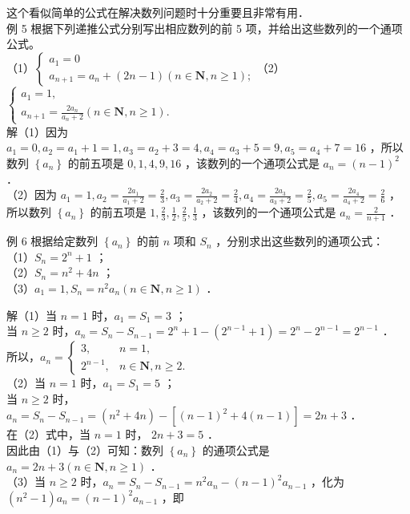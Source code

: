 \documentclass[10pt]{article}
\begin{document}
这个看似简单的公式在解决数列问题时十分重要且非常有用．\\
例 5 根据下列递推公式分别写出相应数列的前 5 项，并给出这些数列的一个通项公式。\\
（1）\(\left\{\begin{array}{l}a_{1}=0 \\ a_{n+1}=a_{n}+(2 n-1)(n \in \mathbf{N}, n \geqslant 1) ;\end{array}\right.\)（2）\(\left\{\begin{array}{l}a_{1}=1, \\ a_{n+1}=\frac{2 a_{n}}{a_{n}+2}(n \in \mathbf{N}, n \geqslant 1) .\end{array}\right.\)\\
解（1）因为 \(a_{1}=0, a_{2}=a_{1}+1=1, a_{3}=a_{2}+3=4, a_{4}=a_{3}+5=9, a_{5}=a_{4}+7=16\) ，所以数列 \(\left\{a_{n}\right\}\) 的前五项是 \(0,1,4,9,16\) ，该数列的一个通项公式是 \(a_{n}=(n-1)^{2}\) ．\\
（2）因为 \(a_{1}=1, a_{2}=\frac{2 a_{1}}{a_{1}+2}=\frac{2}{3}, a_{3}=\frac{2 a_{2}}{a_{2}+2}=\frac{2}{4}, a_{4}=\frac{2 a_{3}}{a_{3}+2}=\frac{2}{5}, a_{5}=\frac{2 a_{4}}{a_{4}+2}=\frac{2}{6}\) ，所以数列 \(\left\{a_{n}\right\}\) 的前五项是 \(1, \frac{2}{3}, \frac{1}{2}, \frac{2}{5}, \frac{1}{3}\) ，该数列的一个通项公式是 \(a_{n}=\frac{2}{n+1}\) ．

例 6 根据给定数列 \(\left\{a_{n}\right\}\) 的前 \(n\) 项和 \(S_{n}\) ，分别求出这些数列的通项公式：\\
（1）\(S_{n}=2^{n}+1\) ；\\
（2）\(S_{n}=n^{2}+4 n\) ；\\
（3）\(a_{1}=1, S_{n}=n^{2} a_{n}(n \in \mathbf{N}, n \geqslant 1)\) ．

解（1）当 \(n=1\) 时，\(a_{1}=S_{1}=3\) ；\\
当 \(n \geqslant 2\) 时，\(a_{n}=S_{n}-S_{n-1}=2^{n}+1-\left(2^{n-1}+1\right)=2^{n}-2^{n-1}=2^{n-1}\) ．\\
所以，\(a_{n}= \begin{cases}3, & n=1, \\ 2^{n-1}, & n \in \mathbf{N}, n \geqslant 2 .\end{cases}\)\\
（2）当 \(n=1\) 时，\(a_{1}=S_{1}=5\) ；\\
当 \(n \geqslant 2\) 时，\(a_{n}=S_{n}-S_{n-1}=\left(n^{2}+4 n\right)-\left[(n-1)^{2}+4(n-1)\right]=2 n+3\) ．\\
在（2）式中，当 \(n=1\) 时， \(2 n+3=5\) ．\\
因此由（1）与（2）可知：数列 \(\left\{a_{n}\right\}\) 的通项公式是 \(a_{n}=2 n+3(n \in \mathbf{N}, n \geqslant 1)\) ．\\
（3）当 \(n \geqslant 2\) 时，\(a_{n}=S_{n}-S_{n-1}=n^{2} a_{n}-(n-1)^{2} a_{n-1}\) ，化为 \(\left(n^{2}-1\right) a_{n}=(n-1)^{2} a_{n-1}\) ，即
\end{document}
